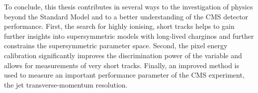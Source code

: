 To conclude, this thesis contributes in several ways to the investigation of physics beyond the Standard Model and to a better understanding of the CMS detector performance. %
First, the search for highly ionising, short tracks helps to gain further insights into supersymmetric models with long-lived charginos and further constrains the supersymmetric parameter space.
Second, the pixel energy calibration significantly improves the discrimination power of the variable \dedx and allows for \dedx measurements of very short tracks.
Finally, an improved method is used to  measure an important performance parameter of the CMS experiment, the jet transverse-momentum resolution.

